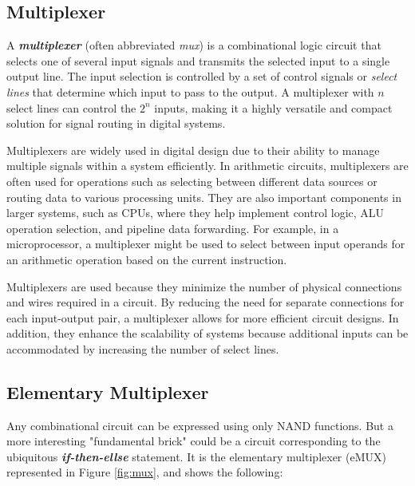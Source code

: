 \subsection{Multiplexer}\label{genericMux}

A {\bf {\em multiplexer}} (often abbreviated \textit{mux}) is a combinational logic circuit that selects one of several input signals and transmits the selected input to a single output line. The input selection is controlled by a set of control signals or \textit{select lines} that determine which input to pass to the output. A multiplexer with $n$ select lines can control the $2^n$ inputs, making it a highly versatile and compact solution for signal routing in digital systems.

Multiplexers are widely used in digital design due to their ability to manage multiple signals within a system efficiently. In arithmetic circuits, multiplexers are often used for operations such as selecting between different data sources or routing data to various processing units. They are also important components in larger systems, such as CPUs, where they help implement control logic, ALU operation selection, and pipeline data forwarding. For example, in a microprocessor, a multiplexer might be used to select between input operands for an arithmetic operation based on the current instruction.

Multiplexers are used because they minimize the number of physical connections and wires required in a circuit. By reducing the need for separate connections for each input-output pair, a multiplexer allows for more efficient circuit designs. In addition, they enhance the scalability of systems because additional inputs can be accommodated by increasing the number of select lines. 

\subsection{Elementary Multiplexer}

Any combinational circuit can be expressed using only NAND functions. But a more interesting "fundamental brick" could be a circuit corresponding to the ubiquitous {\bf {\em if-then-ellse}} statement. It is the elementary multiplexer (eMUX) represented in Figure \ref{fig:mux}, and shows the following:

